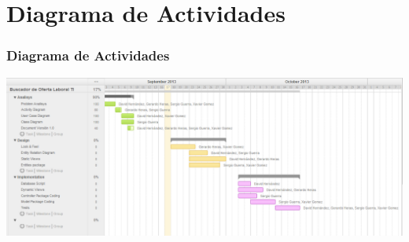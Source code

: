 \section{Diagrama de Actividades}
\frame
{
  \frametitle{Diagrama de Actividades}
 	\includegraphics[scale=0.33]{./resources/ActDiagram.png} 
}